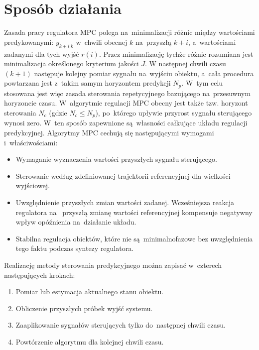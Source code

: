 \section{Sposób działania} \label{sec:howitworks}
Zasada pracy regulatora MPC polega na~minimalizacji różnic między wartościami predykowanymi:
$y_{k+i|k}$ w~chwili obecnej $k$ na~przyszłą $k+i$, a~wartościami zadanymi dla tych wyjść $r(i)$.
Przez minimalizację tychże różnic rozumiana jest minimalizacja określonego kryterium jakości $J$. W
następnej chwili czasu $(k+1)$ następuje kolejny pomiar sygnału na~wyjściu obiektu, a~cała procedura
powtarzana jest z~takim samym horyzontem predykcji $N_{p}$. W~tym celu stosowana jest
więc zasada sterowania repetycyjnego bazującego na~przesuwnym horyzoncie czasu. W~algorytmie regulacji MPC
obecny jest także tzw. horyzont sterowania $N_{c}$ (gdzie $N_{c} \leqslant N_{p}$), po~którego upływie przyrost sygnału
sterującego wynosi zero. W~ten sposób zapewnione są~własności całkujące układu regulacji predykcyjnej.
\cite{mpc_book} \cite{mpc_pl} \cite{mpc_en}
\newline Algorytmy MPC cechują się następującymi wymogami i~właściwościami:
\begin{itemize}
	\item Wymaganie wyznaczenia wartości przyszłych sygnału sterującego.
	\item Sterowanie według zdefiniowanej trajektorii referencyjnej dla wielkości wyjściowej.
    \item Uwzględnienie przyszłych zmian wartości zadanej. Wcześniejsza reakcja regulatora na~
    przyszłą zmianę wartości referencyjnej kompensuje negatywny wpływ opóźnienia na~działanie układu.
	\item Stabilna regulacja obiektów, które nie są~minimalnofazowe bez uwzględnienia tego faktu podczas
    syntezy regulatora.
\end{itemize}
Realizację metody sterowania predykcyjnego można zapisać w~czterech następujących krokach:
\begin{enumerate}
    \item Pomiar lub estymacja aktualnego stanu obiektu.
    \item Obliczenie przyszłych próbek wyjść systemu.
    \item Zaaplikowanie sygnałów sterujących tylko do~następnej chwili czasu.
    \item Powtórzenie algorytmu dla kolejnej chwili czasu.
\end{enumerate}

